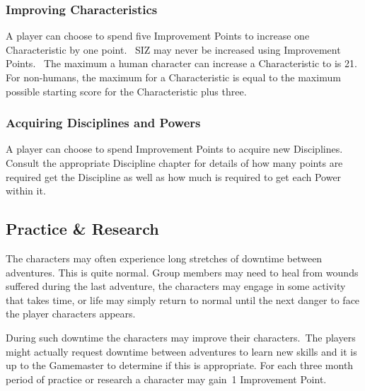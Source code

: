 \subsubsection{Improving Characteristics}
A player can choose to spend five Improvement Points to increase one Characteristic by one point. 
SIZ may never be increased using Improvement Points. 
The maximum a human character can increase a Characteristic to is 21. For non-humans, the maximum for a Characteristic is equal to the maximum possible starting score for the Characteristic plus three.

\subsubsection{Acquiring Disciplines and Powers}
A player can choose to spend Improvement Points to acquire new Disciplines. Consult the appropriate Discipline chapter for details of how many points are required get the Discipline as well as how much is required to get each Power within it.

\subsection{Practice \& Research}
The characters may often experience long stretches of downtime between adventures. This is quite normal. Group members may need to heal from wounds suffered during the last adventure, the characters may engage in some activity that takes time, or life may simply return to normal until the next danger to face the player characters appears.

During such downtime the characters may improve their characters. The players might actually request downtime between adventures to learn new skills and it is up to the Gamemaster to determine if this is appropriate.  
For each three month period of practice or research a character may gain 1 Improvement Point. 



